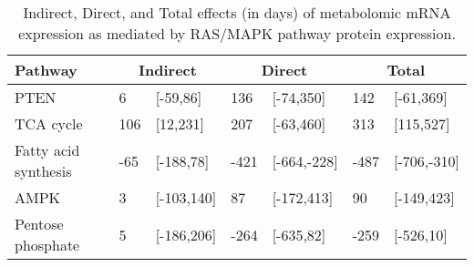 \begin{table}[ht]
\centering
\begin{tabular}{lllllll}
  \hline
  Pathway & \multicolumn{2}{c}{Indirect} & \multicolumn{2}{c}{Direct}  & \multicolumn{2}{c}{Total} \\
 \hline
PTEN & 6 & [-59,86] & 136 & [-74,350] & 142 & [-61,369] \\ 
  TCA cycle & 106 & [12,231] & 207 & [-63,460] & 313 & [115,527] \\ 
  Fatty acid synthesis & -65 & [-188,78] & -421 & [-664,-228] & -487 & [-706,-310] \\ 
  AMPK & 3 & [-103,140] & 87 & [-172,413] & 90 & [-149,423] \\ 
  Pentose phosphate & 5 & [-186,206] & -264 & [-635,82] & -259 & [-526,10] \\ 
   \hline
\end{tabular}
\caption{Indirect, Direct, and Total effects (in days) of metabolomic mRNA expression as mediated by RAS/MAPK pathway protein expression.} 
\end{table}

